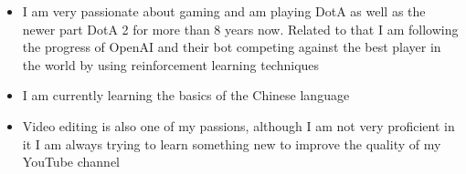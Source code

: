 \documentclass[11pt,a4paper,sans]{moderncv}        %
\begin{document}
\vspace{6pt}

\begin{itemize}

\item{I am very passionate about gaming and am playing DotA as well as the newer part DotA 2 for more than 8 years now. Related to that I am following the progress of OpenAI and their bot competing against the best player in the world by using reinforcement learning techniques} \newline

\item{I am currently learning the basics of the Chinese language} \newline

\item{Video editing is also one of my passions, although I am not very proficient in it I am always trying to learn something new to improve the quality of my YouTube channel}

\end{itemize}

\nocite{*}



\end{document}
